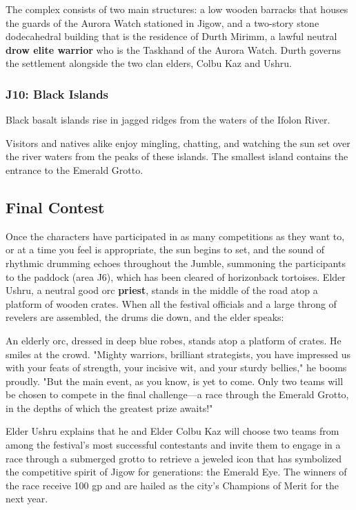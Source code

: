 \documentclass[10pt,a4paper,twoside,fancy,bg=print,twocolumn,openany,nodeprecatedcode]{dndbook}
\begin{document}
The complex consists of two main structures: a low wooden barracks that houses the guards of the Aurora Watch stationed in Jigow, and a two-story stone dodecahedral building that is the residence of Durth Mirimm, a lawful neutral \textbf{drow elite warrior} who is the Taskhand of the Aurora Watch. Durth governs the settlement alongside the two clan elders, Colbu Kaz and Ushru.

\subsubsection{J10: Black Islands}
\begin{DndReadAloud}{}
Black basalt islands rise in jagged ridges from the waters of the Ifolon River.

\end{DndReadAloud}

Visitors and natives alike enjoy mingling, chatting, and watching the sun set over the river waters from the peaks of these islands. The smallest island contains the entrance to the Emerald Grotto.

\subsection{Final Contest}
Once the characters have participated in as many competitions as they want to, or at a time you feel is appropriate, the sun begins to set, and the sound of rhythmic drumming echoes throughout the Jumble, summoning the participants to the paddock (area J6), which has been cleared of horizonback tortoises. Elder Ushru, a neutral good orc \textbf{priest}, stands in the middle of the road atop a platform of wooden crates. When all the festival officials and a large throng of revelers are assembled, the drums die down, and the elder speaks:

\begin{DndReadAloud}{}
An elderly orc, dressed in deep blue robes, stands atop a platform of crates. He smiles at the crowd. "Mighty warriors, brilliant strategists, you have impressed us with your feats of strength, your incisive wit, and your sturdy bellies," he booms proudly. "But the main event, as you know, is yet to come. Only two teams will be chosen to compete in the final challenge—a race through the Emerald Grotto, in the depths of which the greatest prize awaits!"

\end{DndReadAloud}

Elder Ushru explains that he and Elder Colbu Kaz will choose two teams from among the festival's most successful contestants and invite them to engage in a race through a submerged grotto to retrieve a jeweled icon that has symbolized the competitive spirit of Jigow for generations: the Emerald Eye. The winners of the race receive 100 gp and are hailed as the city's Champions of Merit for the next year.
\end{document}
